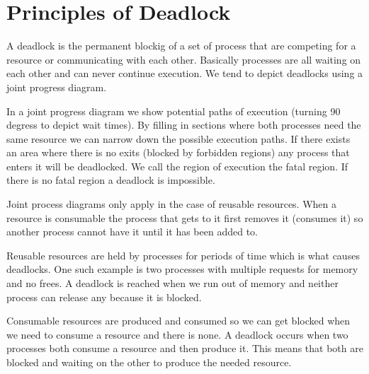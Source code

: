 \documentclass[12pt]{article}
\begin{document}

\section{Principles of Deadlock}
 A deadlock is the permanent blockig of a set of process that are competing for a resource or communicating with each other. Basically processes are all waiting on each other and can never continue execution. We tend to depict deadlocks using a joint progress diagram.

In a joint progress diagram we show potential paths of execution (turning 90 degress to depict wait times). By filling in sections where both processes need the same resource we can narrow down the possible execution paths. If there exists an area where there is no exits (blocked by forbidden regions) any process that enters it will be deadlocked. We call the region of execution the fatal region. If there is no fatal region a deadlock is impossible.

Joint process diagrams only apply in the case of reusable resources. When a resource is consumable the process that gets to it first removes it (consumes it) so another process cannot have it until it has been added to.

Reusable resources are held by processes for periods of time which is what causes deadlocks. One such example is two processes with multiple requests for memory and no frees. A deadlock is reached when we run out of memory and neither process can release any because it is blocked.

Consumable resources are produced and consumed so we can get blocked when we need to consume a resource and there is none. A deadlock occurs when two processes both consume a resource and then produce it. This means that both are blocked and waiting on the other to produce the needed resource.
\end{document}

